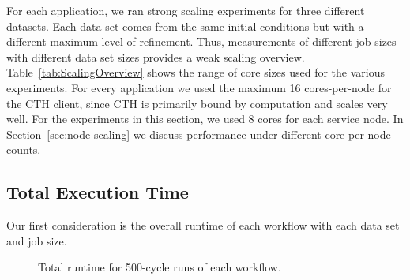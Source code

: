 
For each application, we ran strong scaling experiments for three different
datasets.  Each data set comes from the same initial conditions but with a
different maximum level of refinement.  Thus, measurements of different job
sizes with different data set sizes provides a weak scaling overview.
Table~\ref{tab:ScalingOverview} shows the range of core sizes used for the
various experiments.  For every application we used the maximum 16
cores-per-node for the CTH client, since CTH is primarily bound by
computation and scales very well.  For the \intransit experiments in this
section, we used 8 cores for each service node.  In
Section~\ref{sec:node-scaling} we discuss \intransit performance under different
core-per-node counts.



\subsection{Total Execution Time}
\label{sec:TotalExecutionTime}

Our first consideration is the overall runtime of each workflow with each
data set and job size.

\begin{figure}[htbp]
\begin{centering}
\vspace{-6pt}

\vspace{-6pt}

\vspace{-6pt}
\caption[Total runtime.]{Total runtime for 500-cycle runs of each
  workflow.}
\label{fig:runtime-individual}
\end{centering}
\end{figure}

